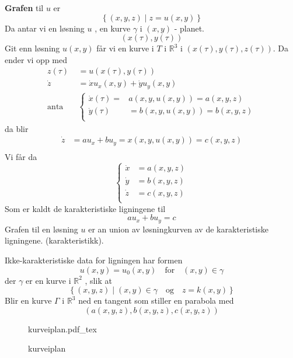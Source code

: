 \documentclass{article}
\newcommand{\incfig}[2][1]{%
\def\svgwidth{#1\columnwidth}
{#2.pdf_tex} } \pdfsuppresswarningpagegroup=1
\theoremstyle{remark}
\newcommand{\newpara}
  {
  \vskip 0.4cm
  }
\begin{document}
\begin{tcolorbox}
  \textbf{Grafen} til $u$ er \[
  \left\{ \left( x,y,z \right)  \mid  z = u\left( x,y \right) \right\}
  \] 
  Da antar vi en løsning $u$ , en kurve $\gamma $ i $\left( x,y \right)$ - planet.\[
  \left( x\left( \tau  \right) , y\left( \tau  \right)\right)
  \] 
  Git enn løsning $u\left( x,y \right)$ får vi en kurve i $T$ i $\mathbb{R} ^{3}$ i $\left( x\left( \tau  \right), y\left( \tau  \right), z\left( \tau  \right) \right)$.
  Da ender vi opp med \[
    \begin{split}
  z\left( \tau   \right)  & = u\left( x\left( \tau  \right), y\left( \tau  \right) \right) \\
  \dot{z} &=  \dot{x}u_{x}\left( x,y \right) + \dot{y}u_{y}\left( x,y \right) \\
  \text{anta} \quad   &  \begin{cases}
    \dot{x}\left( \tau  \right) = &  a \left( x,y, u\left( x,y \right) \right) = a\left( x,y,z \right) \\
    \dot{y}\left( \tau  \right) &= b\left( x,y, u\left( x,y \right) \right) = b\left( x,y,z \right) \\
  \end{cases} 
    \end{split} 
  \] 
  da blir \[
    \begin{split}
  \dot{z} &= a u_{x} + b u_{y} = x\left( x,y, u\left( x,y \right) \right) = c\left( x,y,z \right) \\
    \end{split} 
  \] 
  Vi får da \[
  \begin{cases}
    \dot{x} &= a\left( x,y,z \right) \\
    \dot{y} &=  b\left( x,y,z \right) \\
    \dot{z} &= c\left( x,y,z \right) \\
  \end{cases}
  \] 
  Som er kaldt de karakteristiske ligningene til \[
  a u_{x} + b u_{y} = c
  \] 
  Grafen til en løsning $u$ er an union av løsningkurven av de karakteristiske ligningene. (karakteristikk).
  
  \newpara
  Ikke-karakteristiske data for ligningen har formen \[
  u\left( x,y \right) = u_{0} \left( x,y \right) \quad \text{for} \quad  \left( x,y \right) \in \gamma   
  \] 
  der $\gamma $ er en kurve i $\mathbb{R} ^{2} $ , slik at \[
    \left\{ \left( x,y,z \right)  \mid  \left( x,y \right) \in  \gamma \quad \text{og} \quad  z = k\left( x,y  \right)    \right\}
  \] 
  Blir en kurve $\Gamma $ i $\mathbb{R} ^{3} $ ned en tangent som stiller en parabola med \[
  \left( a\left( x,y,z \right), b\left( x,y,z \right) , c\left( x,y,z  \right) \right)
  \] 

\end{tcolorbox}
\begin{figure}[ht]
    \centering
    \incfig{kurveiplan}
    \caption{kurveiplan}
    \label{fig:kurveiplan}
\end{figure}
\end{document}
